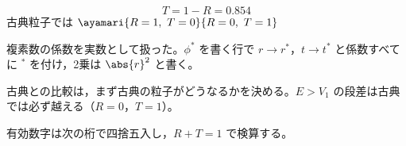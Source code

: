 \[ T=1-R=0.854 \]
古典粒子では $\ayamari{R=1,\ T=0}{R=0,\ T=1}$
\item {} 複素数の係数を実数として扱った。$\phi^{*}$ を書く行で $r\to r^{*}$，$t\to t^{*}$ と係数すべてに ${}^{*}$ を付け，2乗は $\abs{r}^{2}$ と書く。
\item 古典との比較は，まず古典の粒子がどうなるかを決める。$E>V_{1}$ の段差は古典では必ず越える（$R=0$，$T=1$）。
\item 有効数字は次の桁で四捨五入し，$R+T=1$ で検算する。
